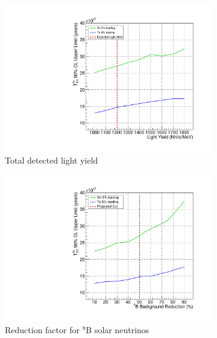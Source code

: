 \begin{figure}
\centering
\begin{subfigure}[b]{0.33\textwidth}
 \includegraphics[width=\textwidth]{dbd/ly_fc.pdf}
 \caption{Total detected light yield}
 \label{fig:scale-ly}
\end{subfigure}
\begin{subfigure}[b]{0.35\textwidth}
 \includegraphics[width=\textwidth]{dbd/b8_reduction_fc.pdf}
 \caption{Reduction factor for $^8$B solar neutrinos}
 \label{fig:scale-b8}
\end{subfigure}\\
\begin{subfigure}[b]{0.33\textwidth}

\end{subfigure}
\end{figure}
